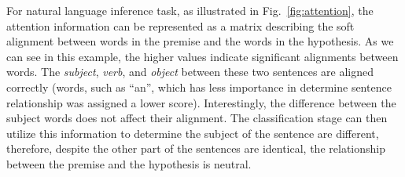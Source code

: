 For natural language inference task, as illustrated in Fig.~\ref{fig:attention}, the attention information can be represented as a matrix describing the soft alignment between words in the premise and the words in the hypothesis. As we can see in this example, the higher values indicate significant alignments between words. The \emph{subject}, \emph{verb}, and \emph{object} between these two sentences are aligned correctly (words, such as ``an'', which has less importance in determine sentence relationship was assigned a lower score). Interestingly, the difference between the subject words does not affect their alignment. The classification stage can then utilize this information to determine the subject of the sentence are different, therefore, despite the other part of the sentences are identical, the relationship between the premise and the hypothesis is neutral.

